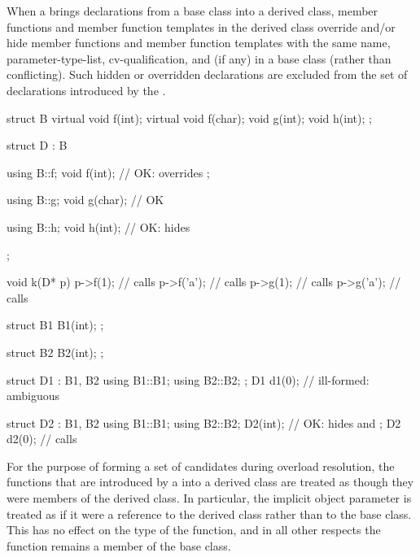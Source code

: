 \pnum
{}%
When a  brings declarations from a base class into
a derived class, member functions and member function templates in
the derived class override and/or hide member functions and member
function templates with the same name,
parameter-type-list, cv-qualification, and  (if any) in a base
class (rather than conflicting).
Such hidden or overridden declarations are excluded from the set of
declarations introduced by the .
\begin{example}

\begin{codeblock}
struct B {
  virtual void f(int);
  virtual void f(char);
  void g(int);
  void h(int);
};

struct D : B {
  using B::f;
  void f(int);      // OK:  overrides ;

  using B::g;
  void g(char);     // OK

  using B::h;
  void h(int);      // OK:  hides 
};

void k(D* p)
{
  p->f(1);          // calls 
  p->f('a');        // calls 
  p->g(1);          // calls 
  p->g('a');        // calls 
}

struct B1 {
  B1(int);
};

struct B2 {
  B2(int);
};

struct D1 : B1, B2 {
  using B1::B1;
  using B2::B2;
};
D1 d1(0);           // ill-formed: ambiguous

struct D2 : B1, B2 {
  using B1::B1;
  using B2::B2;
  D2(int);          // OK:  hides  and 
};
D2 d2(0);           // calls 
\end{codeblock}
\end{example}

\pnum
{}%
\begin{note}
For the purpose of forming a set of candidates during overload resolution,
the functions that are
introduced by a  into a derived class
are treated as though they were members of the derived class. In
particular, the implicit object parameter is treated as if
it were a reference to the derived class rather than to the base class.
This has no effect on the type of the function, and in all other
respects the function remains a member of the base class.
\end{note}

